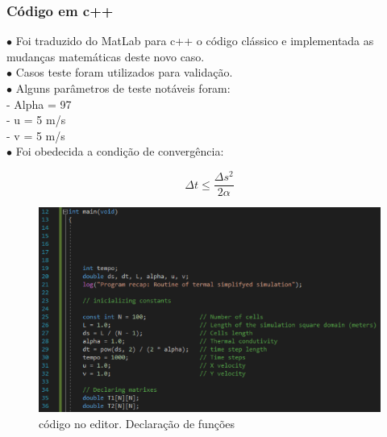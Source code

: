 \documentclass[xcolor=dvipsnames,10pt,aspectratio=169]{beamer}
\begin{document}
	
	\begin{frame} 
	\frametitle{Código em c++}
	\begin{minipage}[h!]{0.49\textwidth}
	$\bullet$ Foi traduzido do MatLab para c++ o código clássico e implementada as mudanças matemáticas deste novo caso.\\
	$\bullet$ Casos teste foram utilizados para validação.\\
	$\bullet$ Alguns parâmetros de teste notáveis foram: \\
	
	- Alpha = 97 \\
	- u = 5 m/s \\
	- v = 5 m/s \\
	
	$\bullet$ Foi obedecida a condição de convergência:
	
	\begin{equation}
	\Delta t \leq \frac{\Delta s ^2}{2 \alpha} 
	\end{equation}
		
	\end{minipage}
	\begin{minipage}[h!]{0.49\textwidth}
		\begin{figure}[h!]
		\centering
		\includegraphics[trim = {0cm 1cm 5cm 1cm}, clip , angle=0, scale=0.65]{printCodigo1}
		\caption{código no editor. Declaração de funções}
	\end{figure}
	\end{minipage}
	\end{frame}
	
	
	
	
	
\end{document}
